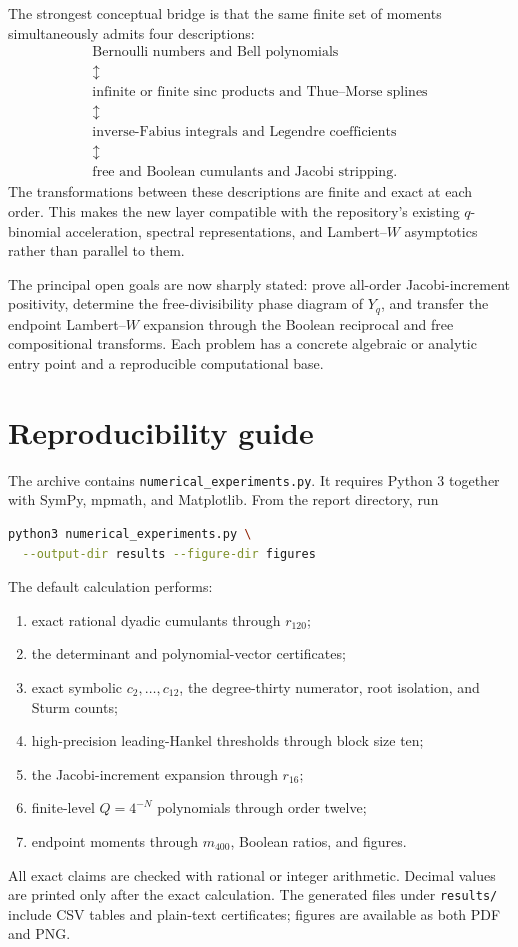 \documentclass[11pt]{article}
\theoremstyle{definition}
\begin{document}
The strongest conceptual bridge is that the same finite set of moments simultaneously admits four descriptions:
\[
\begin{array}{c}
\text{Bernoulli numbers and Bell polynomials}\\
\updownarrow\\
\text{infinite or finite sinc products and Thue--Morse splines}\\
\updownarrow\\
\text{inverse-Fabius integrals and Legendre coefficients}\\
\updownarrow\\
\text{free and Boolean cumulants and Jacobi stripping}.
\end{array}
\]
The transformations between these descriptions are finite and exact at each order. This makes the new layer compatible with the repository's existing \(q\)-binomial acceleration, spectral representations, and Lambert--\(W\) asymptotics rather than parallel to them.

The principal open goals are now sharply stated: prove all-order Jacobi-increment positivity, determine the free-divisibility phase diagram of \(Y_q\), and transfer the endpoint Lambert--\(W\) expansion through the Boolean reciprocal and free compositional transforms. Each problem has a concrete algebraic or analytic entry point and a reproducible computational base.

\section{Reproducibility guide}
\label{sec:repro}
The archive contains \texttt{numerical\_experiments.py}. It requires Python 3 together with SymPy, mpmath, and Matplotlib. From the report directory, run
\begin{lstlisting}[language=bash,basicstyle=\ttfamily\small,frame=single]
python3 numerical_experiments.py \
  --output-dir results --figure-dir figures
\end{lstlisting}
The default calculation performs:
\begin{enumerate}[label=(\arabic*)]
\item exact rational dyadic cumulants through \(r_{120}\);
\item the determinant and polynomial-vector certificates;
\item exact symbolic \(c_2,\ldots,c_{12}\), the degree-thirty numerator, root isolation, and Sturm counts;
\item high-precision leading-Hankel thresholds through block size ten;
\item the Jacobi-increment expansion through \(r_{16}\);
\item finite-level \(Q=4^{-N}\) polynomials through order twelve;
\item endpoint moments through \(m_{400}\), Boolean ratios, and figures.
\end{enumerate}
All exact claims are checked with rational or integer arithmetic. Decimal values are printed only after the exact calculation. The generated files under \texttt{results/} include CSV tables and plain-text certificates; figures are available as both PDF and PNG.
\end{document}

